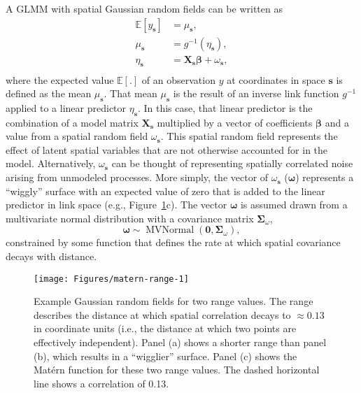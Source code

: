 \documentclass[article]{jss}\usepackage[]{graphicx}\usepackage[dvipsnames]{xcolor}
\begin{document}
A GLMM with spatial Gaussian random fields can be written as
\[
\begin{aligned}
\mathbb{E}[y_{\bm{s}}] &= \mu_{\bm{s}},\\
\mu_{\bm{s}} &=
g^{-1} \left( \eta_{\bm{s}} \right),\\
\eta_{\bm{s}} &= \bm{X}_{\bm{s}} \bm{\beta} + \omega_{\bm{s}},\\
\end{aligned}
\]
where the expected value $\mathbb{E}[.]$ of an observation $y$ at coordinates in space $\bm{s}$ is defined as the mean $\mu_{\bm{s}}$.
That mean $\mu_{\bm{s}}$ is the result of an inverse link function $g^{-1}$ applied to a linear predictor $\eta_{\bm{s}}$.
In this case, that linear predictor is the combination of a model matrix $\bm{X}_{\bm{s}}$ multiplied by a vector of coefficients $\bm{\beta}$ and a value from a spatial random field $\omega_{\bm{s}}$.
This spatial random field represents the effect of latent spatial variables that are not otherwise accounted for in the model.
Alternatively, $\omega_{\bm{s}}$ can be thought of representing spatially correlated noise arising from unmodeled processes.
More simply, the vector of $\omega_{\bm{s}}$ ($\bm{\omega}$) represents a ``wiggly'' surface with an expected value of zero that is added to the linear predictor in link space (e.g., Figure~\ref{fig:matern-range}c).
The vector $\bm{\omega}$ is assumed drawn from a multivariate normal distribution with a covariance matrix $\boldsymbol{\Sigma}_\omega$,
\[
\boldsymbol{\omega} \sim \operatorname{MVNormal}
  \left( \boldsymbol{0}, \boldsymbol{\Sigma}_\omega \right),
\]
constrained by some function that defines the rate at which spatial covariance decays with distance.

\begin{Schunk}
\begin{figure}[ht]

{\centering \texttt{[image: Figures/matern-range-1]}

}

\caption[Example Gaussian random fields for two range values]{Example Gaussian random fields for two range values. The range describes the distance at which spatial correlation decays to $\approx 0.13$ in coordinate units (i.e., the distance at which two points are effectively independent). Panel (a) shows a shorter range than panel (b), which results in a ``wigglier'' surface. Panel (c) shows the Mat\'ern function for these two range values. The dashed horizontal line shows a correlation of 0.13.}\label{fig:matern-range}
\end{figure}
\end{Schunk}
\end{document}
